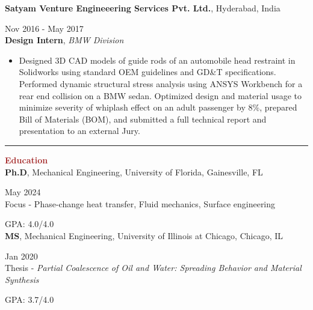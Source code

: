 \documentclass[11pt, letterpaper]{article}
\begin{document}
\textbf{Satyam Venture Engineeering Services Pvt. Ltd.}, Hyderabad, India \hfill \raggedright{Nov 2016 - May 2017}\\
\textbf{Design Intern}, \textit{BMW Division}
\begin{itemize}[leftmargin=*]
\setlength\itemsep{-2pt}
\vspace{-5pt}
\item Designed 3D CAD models of guide rods of an automobile head restraint in Solidworks using standard OEM guidelines and GD\&T specifications. Performed dynamic structural stress analysis using ANSYS Workbench for a rear end collision on a BMW sedan. Optimized design and material usage to minimize severity of whiplash effect on an adult passenger by 8\%, prepared Bill of Materials (BOM), and submitted a full technical report and presentation to an external Jury.
\end{itemize}
\vspace{-8pt}
\noindent \rule[2pt]{\textwidth}{0.5pt}
\noindent \textbf{\large \textcolor{Brown}{Education}}\vspace{2pt}\\
\textbf{Ph.D}, Mechanical Engineering, University of Florida, Gainesville, FL \hfill \raggedright{May 2024}\\
 Focus - Phase-change heat transfer, Fluid mechanics, Surface engineering \hfill \raggedright{GPA: 4.0/4.0}\\
\vspace{6pt}
\textbf{MS}, Mechanical Engineering, University of Illinois at Chicago, Chicago, IL \hfill \raggedright{Jan 2020}\\
Thesis - \textit{Partial Coalescence of Oil and Water: Spreading Behavior and Material Synthesis} \hfill \raggedright{GPA: 3.7/4.0}\\
\end{document}
